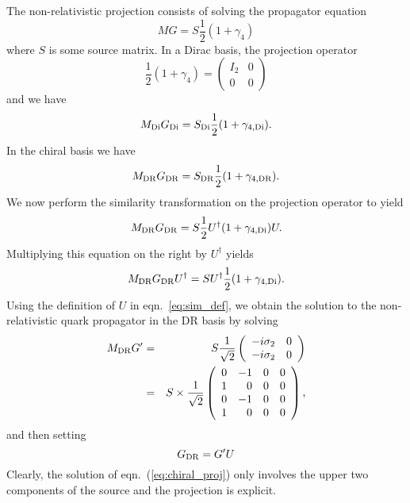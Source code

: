 \documentclass[12pt]{article}
\newcommand{\ch}{{\rm DR}}
\newcommand{\dirac}{{\rm Di}}
\begin{document}
The non-relativistic projection consists of solving the propagator
equation
\begin{equation}
M G = S \frac{1}{2} (1 + \gamma_4)
\end{equation}
where $S$ is some source matrix.  In a Dirac basis, the projection
operator
\begin{equation}
\frac{1}{2} (1 + \gamma_4) = \left( 
\begin{array}{rr}
I_2 & 0 \\
0 & 0
\end{array}
\right)
\end{equation}
and we have
\begin{equation}
M_\dirac G_\dirac = S_\dirac \frac{1}{2} (1 + \gamma_{4,\dirac}).
\label{eq:prop_dirac}
\end{equation}
In the chiral basis we have
\begin{equation}
M_\ch G_\ch = S_\ch \frac{1}{2} (1 + \gamma_{4,\ch}).
\label{eq:prop_chiral}
\end{equation}
We now perform the similarity transformation on the projection
operator to yield
\begin{equation}
M_\ch G_\ch = S \frac{1}{2} U^{\dagger} (1 + \gamma_{4,\dirac}) U.
\end{equation}
Multiplying this equation on the right by $U^{\dagger}$ yields
\begin{equation}
M_\ch G_\ch U^{\dagger} = S U^{\dagger} \frac{1}{2} ( 1 +
\gamma_{4,\dirac}).\label{eq:chiral_proj}
\end{equation}
Using the definition of $U$ in eqn.~\ref{eq:sim_def}, we obtain the
solution to the non-relativistic quark propagator in the DR basis by solving
\begin{eqnarray}
M_\ch G' & = & S \frac{1}{\sqrt{2}}
\left(
\begin{array}{rr}
- i \sigma_2 & 0\\
-i \sigma_2 & 0
\end{array}
\right) \nonumber \\
& = & S \times \frac{1}{\sqrt{2}} \left( \begin{array}{rrrr}
0 & -1 & 0 & 0 \\
1 & 0 & 0 & 0 \\
0 & -1 & 0 & 0 \\
1 & 0 & 0 & 0
\end{array}
\right),
\end{eqnarray}
and then setting
\begin{equation}
G_\ch = G' U
\end{equation}
Clearly, the solution of eqn.~(\ref{eq:chiral_proj}) only involves the
upper two components of the source and the projection is explicit.
\end{document}
